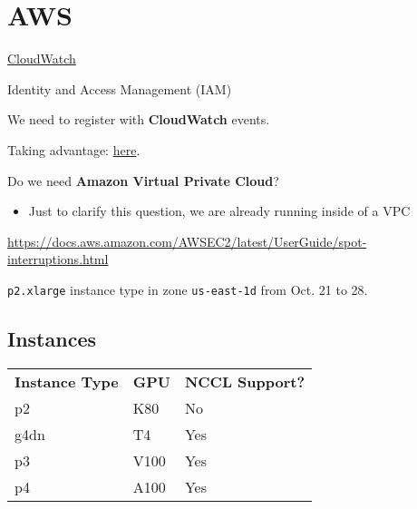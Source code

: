 \chapter{AWS}
\label{ch:aws}

\href{https://docs.aws.amazon.com/cloudwatch/index.html}{CloudWatch}

Identity and Access Management (IAM)

We need to register with \textbf{CloudWatch} events.

Taking advantage:
\href{https://aws.amazon.com/blogs/compute/taking-advantage-of-amazon-ec2-spot-instance-interruption-notices/}{here}.

Do we need \textbf{Amazon Virtual Private Cloud}?
\begin{itemize}
    \item Just to clarify this question, we are already running inside of a VPC
\end{itemize}

\url{https://docs.aws.amazon.com/AWSEC2/latest/UserGuide/spot-interruptions.html}




\texttt{p2.xlarge} instance type in zone \texttt{us-east-1d} from Oct. 21 to 28.




\section{Instances}
\vspace{-2em}
\begin{table}
  \begin{tabular}{|l|l|l|}
    \textbf{Instance Type} & \textbf{GPU} & \textbf{NCCL Support?} \\
    p2 & K80 & No \\
    g4dn & T4 & Yes \\
    p3 & V100 & Yes \\
    p4 & A100 & Yes
  
  \end{tabular}
\end{table}
